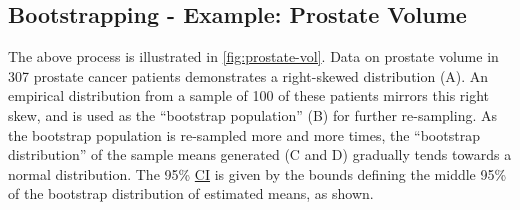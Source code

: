 \documentclass[
]{article}
\begin{document}
\subsection{Bootstrapping - Example: Prostate Volume}\label{bootstrapping---example-prostate-volume}

The above process is illustrated in \ref{fig:prostate-vol}. Data on prostate volume in 307 prostate cancer patients demonstrates a right-skewed distribution (A). An empirical distribution from a sample of 100 of these patients mirrors this right skew, and is used as the ``bootstrap population'' (B) for further re-sampling. As the bootstrap population is re-sampled more and more times, the ``bootstrap distribution'' of the sample means generated (C and D) gradually tends towards a normal distribution. The 95\% \hyperref[acronyms_CI]{CI} is given by the bounds defining the middle 95\% of the bootstrap distribution of estimated means, as shown.
\end{document}
